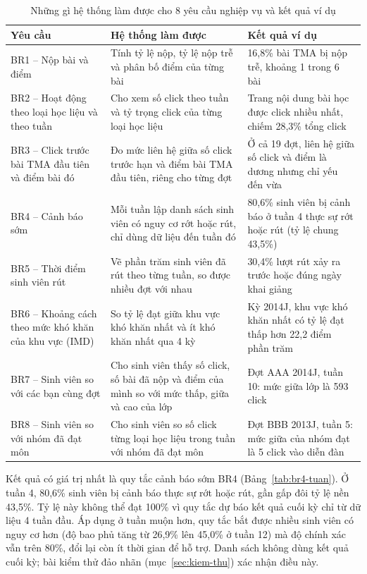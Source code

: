 \begin{table}[htbp]
\centering
\small
\begin{tabularx}{\textwidth}{|p{2.6cm}|X|X|}
\hline
\textbf{Yêu cầu} & \textbf{Hệ thống làm được} & \textbf{Kết quả ví dụ} \\ \hline
BR1 -- Nộp bài và điểm & Tính tỷ lệ nộp, tỷ lệ nộp trễ và phân bố điểm của từng bài & 16,8\% bài TMA bị nộp trễ, khoảng 1 trong 6 bài \\ \hline
BR2 -- Hoạt động theo loại học liệu và theo tuần & Cho xem số click theo tuần và tỷ trọng click của từng loại học liệu & Trang nội dung bài học được click nhiều nhất, chiếm 28,3\% tổng click \\ \hline
BR3 -- Click trước bài TMA đầu tiên và điểm bài đó & Đo mức liên hệ giữa số click trước hạn và điểm bài TMA đầu tiên, riêng cho từng đợt & Ở cả 19 đợt, liên hệ giữa số click và điểm là dương nhưng chỉ yếu đến vừa \\ \hline
BR4 -- Cảnh báo sớm & Mỗi tuần lập danh sách sinh viên có nguy cơ rớt hoặc rút, chỉ dùng dữ liệu đến tuần đó & 80,6\% sinh viên bị cảnh báo ở tuần 4 thực sự rớt hoặc rút (tỷ lệ chung 43,5\%) \\ \hline
BR5 -- Thời điểm sinh viên rút & Vẽ phần trăm sinh viên đã rút theo từng tuần, so được nhiều đợt với nhau & 30,4\% lượt rút xảy ra trước hoặc đúng ngày khai giảng \\ \hline
BR6 -- Khoảng cách theo mức khó khăn của khu vực (IMD) & So tỷ lệ đạt giữa khu vực khó khăn nhất và ít khó khăn nhất qua 4 kỳ & Kỳ 2014J, khu vực khó khăn nhất có tỷ lệ đạt thấp hơn 22,2 điểm phần trăm \\ \hline
BR7 -- Sinh viên so với các bạn cùng đợt & Cho sinh viên thấy số click, số bài đã nộp và điểm của mình so với mức thấp, giữa và cao của lớp & Đợt AAA 2014J, tuần 10: mức giữa lớp là 593 click \\ \hline
BR8 -- Sinh viên so với nhóm đã đạt môn & Cho sinh viên so số click từng loại học liệu trong tuần với nhóm đã đạt môn & Đợt BBB 2013J, tuần 5: mức giữa của nhóm đạt là 5 click vào diễn đàn \\ \hline
\end{tabularx}
\caption{Những gì hệ thống làm được cho 8 yêu cầu nghiệp vụ và kết quả ví dụ}
\label{tab:ket-qua-br}
\end{table}

Kết quả có giá trị nhất là quy tắc cảnh báo sớm BR4 (Bảng~\ref{tab:br4-tuan}). Ở tuần 4, 80,6\%
sinh viên bị cảnh báo thực sự rớt hoặc rút, gần gấp đôi tỷ lệ nền 43,5\%. Tỷ lệ này không thể đạt
100\% vì quy tắc dự báo kết quả cuối kỳ chỉ từ dữ liệu 4 tuần đầu. Áp dụng ở tuần muộn hơn, quy
tắc bắt được nhiều sinh viên có nguy cơ hơn (độ bao phủ tăng từ 26,9\% lên 45,0\% ở tuần 12) mà độ
chính xác vẫn trên 80\%, đổi lại còn ít thời gian để hỗ trợ. Danh sách không dùng kết quả cuối kỳ;
bài kiểm thử đảo nhãn (mục~\ref{sec:kiem-thu}) xác nhận điều này.

